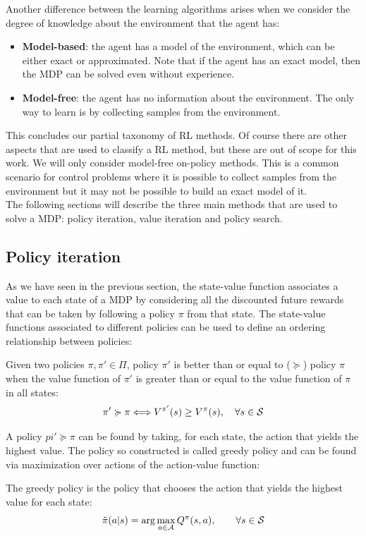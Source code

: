 Another difference between the learning algorithms arises when we consider the degree of knowledge about the environment that the agent has:
\begin{itemize}
\item \textbf{Model-based}: the agent has a model of the environment, which can be either exact or approximated. Note that if the agent has an exact model, then the MDP can be solved even without experience.
\item \textbf{Model-free}: the agent has no information about the environment. The only way to learn is by collecting samples from the environment.
\end{itemize}

This concludes our partial taxonomy of RL methods. Of course there are other aspects that are used to classify a RL method, but these are out of scope for this work. We will only consider model-free on-policy methods. This is a common scenario for  control problems where it is possible to collect samples from the environment but it may not be possible to build an exact model of it.\\
The following sections will describe the three main methods that are used to solve a MDP: policy iteration, value iteration and policy search.

\subsection{Policy iteration}
As we have seen in the previous section, the state-value function associates a value to each state of a MDP by considering all the discounted future rewards that can be taken by following a policy $\pi$ from that state. The state-value functions associated to different policies can be used to define an ordering relationship between policies:

\begin{definition}
Given two policies $\pi, \pi' \in \Pi$, policy $\pi'$ is better than or equal to ($\succcurlyeq$) policy $\pi$ when the value function of $\pi'$ is greater than or equal to the value function of $\pi$ in all states:
\[
\pi' \succcurlyeq \pi \Longleftrightarrow V^{\pi'}(s) \geq V^{\pi}(s),\quad \forall s \in \mathcal{S}
\]
\end{definition}

A policy $pi'\succcurlyeq\pi$ can be found by taking, for each state, the action that yields the highest value. The policy so constructed is called greedy policy and can be found via maximization over actions of the action-value function:
\begin{definition}
The greedy policy is the policy that chooses the action that yields the highest value for each state:
\[
\tilde{\pi}(a|s) = \arg\max_{a\in\mathcal{A}} Q^{\pi}(s,a), \qquad \forall s \in \mathcal{S}
\]
\end{definition}

